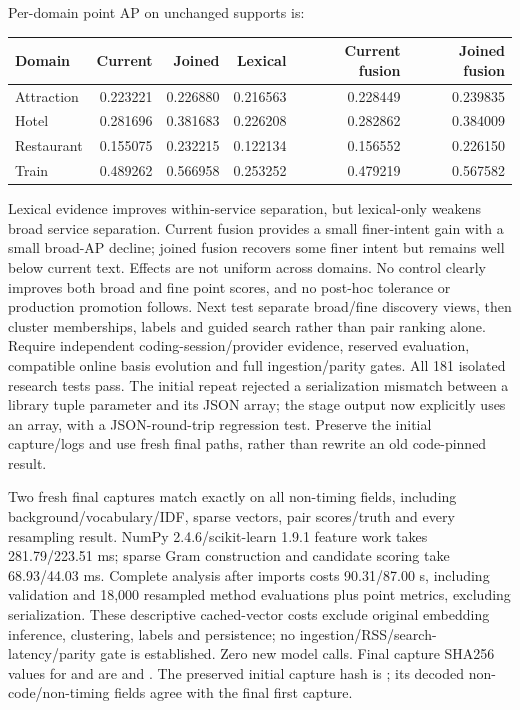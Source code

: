 \documentclass[11pt]{article}
\begin{document}
Per-domain point AP on unchanged supports is:
\begin{center}
\begin{tabular}{lrrrrr}
\toprule
Domain & Current & Joined & Lexical & Current fusion & Joined fusion \\
\midrule
Attraction & 0.223221 & 0.226880 & 0.216563 & 0.228449 & 0.239835 \\
Hotel & 0.281696 & 0.381683 & 0.226208 & 0.282862 & 0.384009 \\
Restaurant & 0.155075 & 0.232215 & 0.122134 & 0.156552 & 0.226150 \\
Train & 0.489262 & 0.566958 & 0.253252 & 0.479219 & 0.567582 \\
\bottomrule
\end{tabular}
\end{center}
Lexical evidence improves within-service separation, but lexical-only weakens
broad service separation. Current fusion provides a small finer-intent gain
with a small broad-AP decline; joined fusion recovers some finer intent but
remains well below current text. Effects are not uniform across domains. No
control clearly improves both broad and fine point scores, and no post-hoc
tolerance or production promotion follows. Next test separate broad/fine
discovery views, then cluster memberships, labels and guided search rather than
pair ranking alone. Require independent coding-session/provider evidence,
reserved evaluation, compatible online basis evolution and full ingestion/parity
gates. All 181 isolated research tests pass. The initial repeat rejected a
serialization mismatch between a library tuple parameter and its JSON array;
the stage output now explicitly uses an array, with a JSON-round-trip regression
test. Preserve the initial capture/logs and use fresh final paths, rather than
rewrite an old code-pinned result.

Two fresh final captures match exactly on all non-timing fields, including
background/vocabulary/IDF, sparse vectors, pair scores/truth and every resampling
result. NumPy 2.4.6/scikit-learn 1.9.1 feature work takes 281.79/223.51 ms;
sparse Gram construction and candidate scoring take 68.93/44.03 ms. Complete
analysis after imports costs 90.31/87.00 s, including validation and 18,000
resampled method evaluations plus point metrics, excluding serialization.
These descriptive cached-vector costs exclude original embedding inference,
clustering, labels and persistence; no ingestion/RSS/search-latency/parity gate
is established. Zero new model calls. Final capture SHA256 values for
 and  are
and .
The preserved initial capture hash is
;
its decoded non-code/non-timing fields agree with the final first capture.
\end{document}
